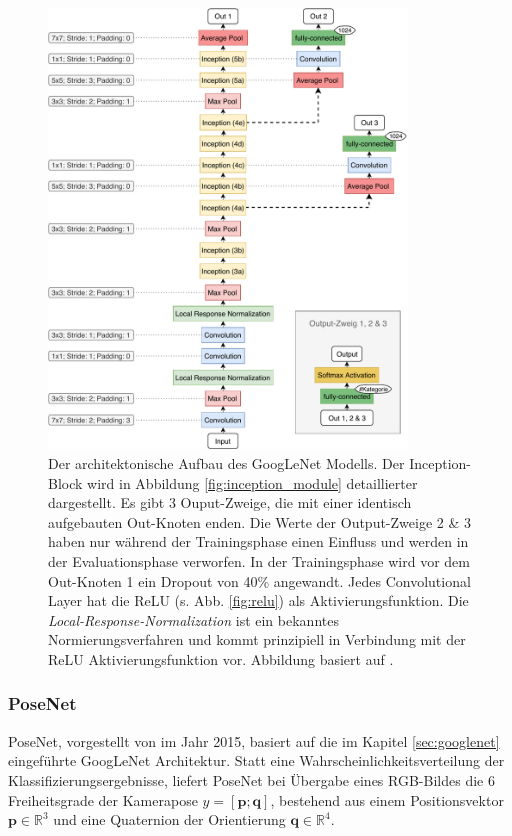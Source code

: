 \begin{figure}[bp]
		\centering
		\includegraphics[width=0.85\textwidth]{images/googlenet/googlenet_diagram.pdf}
		\caption{Der architektonische Aufbau des GoogLeNet Modells. Der Inception-Block wird in Abbildung \ref{fig:inception_module} detaillierter dargestellt. Es gibt 3 Ouput-Zweige, die mit einer identisch aufgebauten Out-Knoten enden. Die Werte der Output-Zweige 2 \& 3 haben nur während der Trainingsphase einen Einfluss und werden in der Evaluationsphase verworfen. In der Trainingsphase wird vor dem Out-Knoten 1 ein Dropout von 40\% angewandt. Jedes Convolutional Layer hat die ReLU (s. Abb. \ref{fig:relu}) als Aktivierungsfunktion. Die \textit{Local-Response-Normalization} \cite{krizhevskyImageNetClassificationDeep2012} ist ein bekanntes Normierungsverfahren und kommt prinzipiell in Verbindung mit der ReLU Aktivierungsfunktion vor. Abbildung basiert auf \cite{szegedyGoingDeeperConvolutions2015}.}
		\label{fig:googlenet}
\end{figure}
\subsubsection{PoseNet}
\label{sec:posenet}
PoseNet, vorgestellt von \citet{kendallPoseNetConvolutionalNetwork2015} im Jahr 2015, basiert auf die im Kapitel \ref{sec:googlenet} eingeführte GoogLeNet Architektur. Statt eine Wahrscheinlichkeitsverteilung der Klassifizierungsergebnisse, liefert PoseNet bei Übergabe eines RGB-Bildes die 6 Freiheitsgrade der Kamerapose $y = [\pmb{p};\pmb{q}]$, bestehend aus einem Positionsvektor $\pmb{p} \in  \mathbb{R}^{3}$ und eine Quaternion der Orientierung $ \pmb{q} \in  \mathbb{R}^{4}$.

